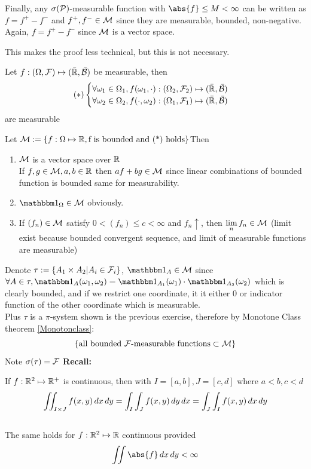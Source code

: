Finally, any $\sigma(\mathcal{P})$-measurable function with $\abs{f}\leq M < \infty$ can be written as $f = f^+ - f^-$ and $f^+, f^- \in \mathcal{M}$ since they are measurable, bounded, non-negative. Again, $f = f^+ - f^-$ since $\mathcal{M}$ is a vector space.
\begin{rem}[Boundness of $f\in \M$] This makes the proof less technical, but this is not necessary.
\end{rem}
\begin{prop}\label{mesurability}
Let $f:(\Omega, \mathcal{F}) \mapsto (\bar{\mathbb{R}}, \bar{\mathcal{B}})$ be measurable, then 
\begin{align*}
 (*)\begin{cases}
   \forall \omega_1 \in \Omega_1, f(\omega_1, \cdot): (\Omega_2, \mathcal{F}_2) \mapsto (\bar{\mathbb{R}}, \bar{\mathcal{B}}) \\
    \forall \omega_2 \in \Omega_2, f(\cdot,\omega_2): (\Omega_1, \mathcal{F}_1) \mapsto (\bar{\mathbb{R}}, \bar{\mathcal{B}})
\end{cases}
\end{align*} are measurable
\end{prop}
\pf Let $\mathcal{M} :=\{ f:\Omega\mapsto\mathbb{R}, \text{f is bounded and (*) holds}\}$Then \begin{enumerate}
    \item $\mathcal{M}$ is a vector space over $\mathbb{R}$ \\
    If $f,g\in \mathcal{M}, a,b\in \mathbb{R}$ then $af+bg \in \mathcal{M}$ since linear combinations of bounded function is bounded same for measurability.
    \item $\I_\Omega \in \M$ obviously.
    \item If $(f_n) \in \mathcal{M}$ satisfy $ 0<(f_n)\leq c < \infty$ and $f_n \uparrow$, then $\lim\limits_{n} f_n \in \mathcal{M}$ (limit exist because bounded convergent sequence, and limit of measurable functions are measurable)
\end{enumerate}Denote $\tau:= \{A_1 \times A_2 | A_i\in \mathcal{F}_i\}$, $\I_A \in \M$ since $\forall A\in \tau, \I_A{(\omega_1, \omega_2)} = \I_{A_1}(\omega_1)\cdot \I_{A_2}(\omega_2)$ which is clearly bounded, and if we restrict one coordinate, it it either 0 or indicator function of the other coordinate which is measurable.\\
Plus $\tau$ is a $\pi$-system shown is the previous exercise, therefore by Monotone Class theorem \ref{Monotonclass}:
\begin{equation*}
    \{\text{all bounded $\mathcal{F}$-measurable functions} \subset \mathcal{M}\}
\end{equation*}Note $\sigma(\tau) = \mathcal{F}$ 
\newpage
\textbf{Recall:}
\begin{thm}
If $f:\mathbb{R}^2 \mapsto\mathbb{R}^+$ is continuous, then with $I = [a,b], J = [c,d]$ where $a<b, c<d$ 
\begin{equation*}
    \iint_{I\times J} f(x,y) \mathop{}\!d x\mathop{}\!d y = \int_I \int_J f(x,y) \mathop{}\!d y\mathop{}\!d x = \int_J \int_I f(x,y) \mathop{}\!d x\mathop{}\!d y
\end{equation*} \\
The same holds for $f:\mathbb{R}^2 \mapsto\mathbb{R}$ continuous provided
\begin{equation*}
    \iint \abs{f} \diff x\diff y < \infty
\end{equation*}
\end{thm}

